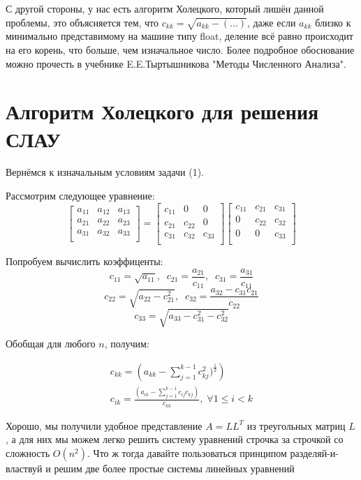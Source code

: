 \documentclass[12pt]{article}
\begin{document}
	С другой стороны, у нас есть алгоритм Холецкого, который лишён данной проблемы, это объясняется тем, что $c_{kk} = \sqrt{a_{kk} - (\dots)}$, даже если $a_{kk}$ близко к минимально представимому на машине типу float, деление всё равно происходит на его корень, что больше, чем изначальное число. Более подробное обоснование можно прочесть в учебнике E.E.Тыртышникова "Методы Численного Анализа".
	
	\section{Алгоритм Холецкого для решения СЛАУ}
	Вернёмся к изначальным условиям задачи (1).
	
	Рассмотрим следующее уравнение:
	\[
	\begin{bmatrix}
		a_{11} & a_{12} & a_{13} \\
		a_{21} & a_{22} & a_{23} \\
		a_{31} & a_{32} & a_{33} \\
	\end{bmatrix}
	=
	\begin{bmatrix}
		c_{11} & 0 & 0 \\
		c_{21} & c_{22} & 0 \\
		c_{31} & c_{32} & c_{33} \\
	\end{bmatrix}
	\begin{bmatrix}
		c_{11} & c_{21} & c_{31} \\
		0 & c_{22} & c_{32} \\
		0 & 0 & c_{33} \\
	\end{bmatrix}
	\]
	
	Попробуем вычислить коэффиценты:
	\[
		c_{11} = \sqrt{a_{11}}, \;\; c_{21} = \frac{a_{21}}{c_{11}}, \;\; c_{31} = \frac{a_{31}}{c_{11}} 
	\]
	\[
		c_{22} = \sqrt{a_{22} - c_{21}^2}, \;\; c_{32} = \frac{a_{32} - c_{31} c_{21}}{c_{22}}
	\]
	\[
		c_{33} = \sqrt{a_{33} - c_{31}^2 - c_{32}^2}
	\]
	
	Обобщая для любого $n$, получим:
	
	\begin{align}
		c_{kk} = \left( a_{kk} - \sum_{j=1}^{k-1} c_{kj}^2)^{\frac{1}{2}} \right) \\
		c_{ik} = \frac{\left( a_{ik} - \sum_{j=1}^{k-1} c_{ij} c_{kj} \right)}{c_{kk}}, \; \forall  1 \le i < k
	\end{align}
	
	Хорошо, мы получили удобное представление $A = L L^T$ из треугольных матриц $L$, а для них мы можем легко решить систему уравнений строчка за строчкой со сложность $O(n^2)$.  Что ж тогда давайте пользоваться принципом разделяй-и-властвуй и решим две более простые системы линейных уравнений
	
\end{document}
